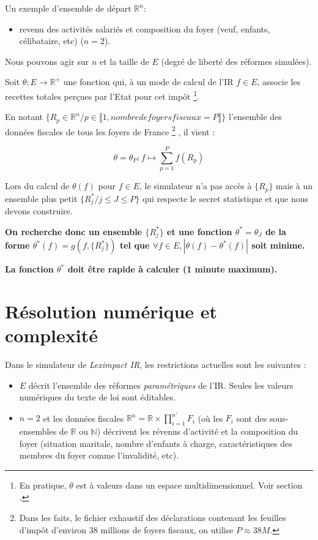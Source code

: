 \documentclass[12pt]{article}
\begin{document}
Un exemple d'ensemble de départ $\mathbb{R}^n$:
\begin{itemize}
  \item revenu des activités salariés et composition du foyer (veuf, enfants, célibataire, etc) ($n=2$).
\end{itemize}

Nous pouvons agir sur $n$ et la taille de $E$ (degré de liberté des réformes simulées).
\newline

Soit $\theta: E \longrightarrow \mathbb{R}^+$ une fonction qui,
à un mode de calcul de l'IR $f \in E$, associe
les recettes totales perçues par l'Etat pour cet impôt
\footnote{En pratique, $\theta$ est à valeurs dans un espace multidimensionnel.
Voir section .}.
\newline

En notant $\{ R_p \in \mathbb{R}^n / p \in  \llbracket 1, nombre de foyers fiscaux = P \rrbracket  \}$
l'ensemble des données fiscales de tous les foyers de France
\footnote{Dans les faits, le fichier exhaustif des déclarations contenant les feuilles d'impôt
d'environ 38 millions de foyers fiscaux, on utilise $P \approx 38M$.}
, il vient :

\begin{displaymath}
\theta = \theta_{P}: f \longmapsto \sum_{p=1}^{P} f(R_p)
\end{displaymath}

Lors du calcul de $\theta(f)$ pour $f \in E$, le simulateur n'a pas accès à $\{ R_p \}$ mais
à un ensemble plus petit $\{ R^*_j / j \leq J \leq P \}$ qui respecte le secret statistique et
que nous devons construire.
\newline

\textbf{On recherche donc un ensemble $\{ R^*_j \}$ et une fonction $\theta^{*}=\theta_J$
de la forme $\theta^{*}(f)=g(f, \{ R^*_j \})$ tel que $\forall f \in E, |\theta(f) - \theta^*(f)|$ soit minime.}
\newline

\textbf{La fonction $\theta^*$ doit être rapide à calculer (1 minute maximum).}

\section{Résolution numérique et complexité}

Dans le simulateur de \emph{Leximpact IR}, les restrictions actuelles sont les suivantes :

\begin{itemize}
  \item $E$ décrit l'ensemble des réformes \emph{paramétriques} de l'IR. Seules les valeurs
  numériques du texte de loi sont éditables.
  \item $n=2$ et les données fiscales $\mathbb{R}^n=\mathbb{R}\times\prod_{i=1}^{n'} F_i$
  (où les $F_i$ sont des sous-ensembles de $\mathbb{R}$ ou $\mathbb{N}$) décrivent les révenus d'activité et la
  composition du foyer (situation maritale, nombre d'enfants à charge, caractéristiques des membres du foyer
  comme l'invalidité, etc).
\end{itemize}
\end{document}

